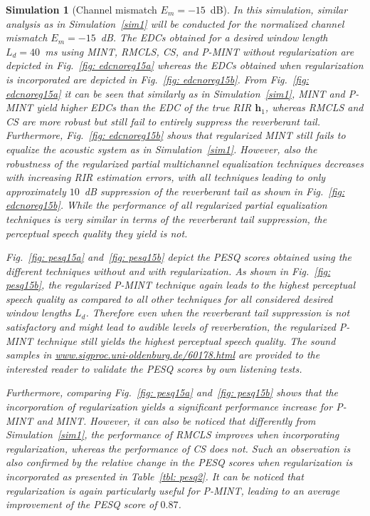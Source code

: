 \documentclass[draftcls,onecolumn,11pt]{IEEEtran}
\newtheorem{simulation}{Simulation}
\begin{document}
\begin{simulation}[Channel mismatch $E_m=-15$~dB]
\label{sim2}
In this simulation, similar analysis as in Simulation~\ref{sim1} will be conducted for the normalized channel mismatch $E_m = -15$~dB.
The EDCs obtained for a desired window length $L_d = 40$~ms using MINT, RMCLS, CS, and P-MINT without regularization are depicted in Fig.~\ref{fig: edcnoreg15a} whereas the EDCs obtained when regularization is incorporated are depicted in Fig.~\ref{fig: edcnoreg15b}.
From Fig.~\ref{fig: edcnoreg15a} it can be seen that similarly as in Simulation~\ref{sim1}, MINT and P-MINT yield higher EDCs than the EDC of the true RIR $\mathbf{h}_1$, whereas RMCLS and CS are more robust but still fail to entirely suppress the reverberant tail.
Furthermore, Fig.~\ref{fig: edcnoreg15b} shows that regularized MINT still fails to equalize the acoustic system as in Simulation~\ref{sim1}.
However, also the robustness of the regularized partial multichannel equalization techniques decreases with increasing RIR estimation errors, with all techniques leading to only approximately $10$~dB suppression of the reverberant tail as shown in Fig.~\ref{fig: edcnoreg15b}.
While the performance of all regularized partial equalization techniques is very similar in terms of the reverberant tail suppression, the perceptual speech quality they yield is not.

Fig.~\ref{fig: pesq15a} and~\ref{fig: pesq15b} depict the PESQ scores obtained using the different techniques without and with regularization.
As shown in Fig.~\ref{fig: pesq15b}, the regularized P-MINT technique again leads to the highest perceptual speech quality as compared to all other techniques for all considered desired window lengths $L_d$. Therefore even when the reverberant tail suppression is not satisfactory and might lead to audible levels of reverberation, the regularized P-MINT technique still yields the highest perceptual speech quality. The sound samples in {\small \url{www.sigproc.uni-oldenburg.de/60178.html}} are provided to the interested reader to validate the PESQ scores by own listening tests.

Furthermore, comparing Fig.~\ref{fig: pesq15a} and~\ref{fig: pesq15b} shows that the incorporation of regularization yields a significant performance increase for P-MINT and MINT.
However, it can also be noticed that differently from Simulation~\ref{sim1}, the performance of RMCLS improves when incorporating regularization, whereas the performance of CS does not.
Such an observation is also confirmed by the relative change in the PESQ scores when regularization is incorporated as presented in Table~\ref{tbl: pesq2}.
It can be noticed that regularization is again particularly useful for P-MINT, leading to an average improvement of the PESQ score of $0.87$.


\end{simulation}
\end{document}
